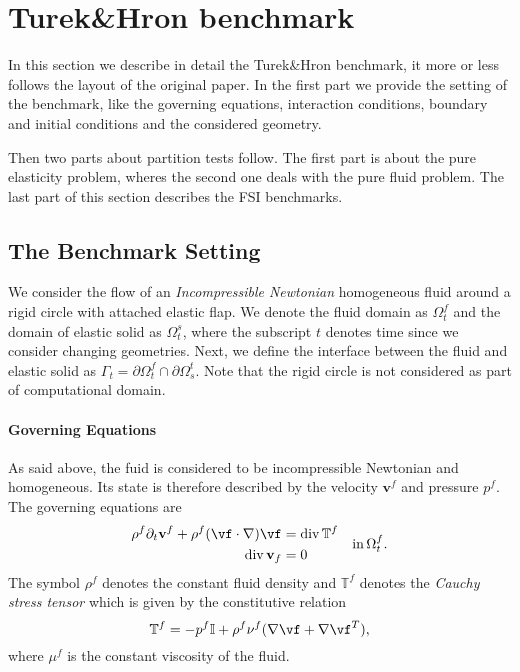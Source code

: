 \section{Turek\&Hron benchmark}
In this section we describe in detail the Turek\&Hron benchmark, it more or less follows the 
layout of the original paper. In the first part we provide 
the setting of the benchmark, like the governing equations, interaction conditions, 
boundary and initial conditions and the considered geometry.

Then two parts about partition tests follow. The first part is about the pure elasticity problem,
wheres the second one deals with the pure fluid problem. The last part of this section describes
the FSI benchmarks.


\subsection{The Benchmark Setting}
We consider the flow of an \emph{Incompressible Newtonian} homogeneous fluid around a rigid circle with
attached elastic flap. We denote the fluid domain as $\Omega_t^f$ and the domain of elastic solid
as $\Omega_t^s$, where the subscript $t$ denotes time since we consider changing geometries. 
Next, we define the interface between the fluid and elastic solid as 
$\Gamma_t = \partial\Omega_t^f \cap \partial\Omega_s^t$.
Note that the rigid circle is not considered as part of computational domain.
\paragraph{Governing Equations} 
As said above, the fuid is considered to be incompressible Newtonian and homogeneous. Its state is
therefore described by the velocity $\mathbf{v}^f$ and pressure $p^f$. The governing equations are
\begin{equation}
  \begin{aligned}
    \rho^f \partial_t \mathbf{v}^f + \rho^f(\vf\cdot\nabla)\vf &= \mathrm{div}\,\mathbb{T}^f \\
    \mathrm{div}\,\mathbf{v}_f &= 0
  \end{aligned}\quad
  \mathrm{in}\, \Omega_t^f.
\end{equation}
The symbol $\rho^f$ denotes the constant fluid density and $\mathbb{T}^f$ denotes the 
\emph{Cauchy stress tensor} which is given by the constitutive relation
\begin{equation}
  \mathbb{T}^f = -p^f\mathbb{I} + \rho^f\nu^f(\nabla\vf + {\nabla\vf}^T),
\end{equation}
where $\mu^f$ is the constant viscosity of the fluid.

